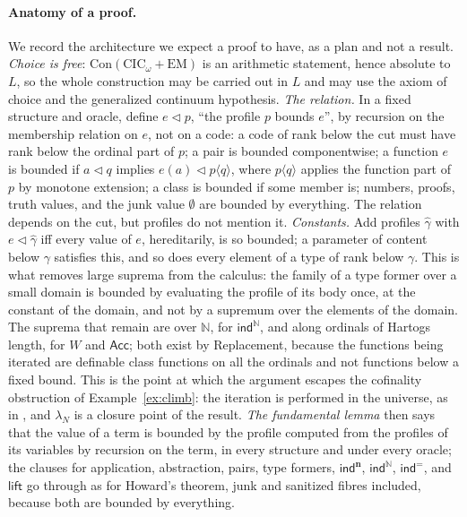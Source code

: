 \documentclass[10pt]{article}
\newcommand{\N}{\mathbb{N}}
\newcommand{\CIC}{\mathrm{CIC}}
\newcommand{\EM}{\mathrm{EM}}
\newcommand{\Con}{\mathrm{Con}}
\newcommand{\ind}{\mathsf{ind}}
\newcommand{\Acc}{\mathsf{Acc}}
\begin{document}
\paragraph{Anatomy of a proof.}
We record the architecture we expect a proof to have, as a plan and not
a result. \emph{Choice is free}: $\Con(\CIC_\omega+\EM)$ is an arithmetic
statement, hence absolute to $L$, so the whole construction may be
carried out in $L$ and may use the axiom of choice and the generalized
continuum hypothesis. \emph{The relation.} In a fixed structure and
oracle, define $e\lhd p$, ``the profile $p$ bounds $e$'', by recursion on
the membership relation on $e$, not on a code: a code of rank below the
cut must have rank below the ordinal part of $p$; a pair is bounded
componentwise; a function $e$ is bounded if $a\lhd q$ implies
$e(a)\lhd p\langle q\rangle$, where $p\langle q\rangle$ applies the function
part of $p$ by monotone extension; a class is bounded if some member
is; numbers, proofs, truth values, and the junk value $\emptyset$ are
bounded by everything. The relation depends on the cut, but profiles do
not mention it. \emph{Constants.} Add profiles $\hat\gamma$ with
$e\lhd\hat\gamma$ iff every value of $e$, hereditarily, is so bounded; a
parameter of content below $\gamma$ satisfies this, and so does every
element of a type of rank below $\gamma$. This is what removes large
suprema from the calculus: the family of a type former over a small
domain is bounded by evaluating the profile of its body once, at the
constant of the domain, and not by a supremum over the elements of the
domain. The suprema that remain are over $\N$, for $\ind^\N$, and along
ordinals of Hartogs length, for $W$ and $\Acc$; both exist by
Replacement, because the functions being iterated are definable class
functions on all the ordinals and not functions below a fixed bound.
This is the point at which the argument escapes the cofinality
obstruction of Example~\ref{ex:climb}: the iteration is performed in the
universe, as in \cite[\S3]{paper2}, and $\lambda_N$ is a closure point of
the result. \emph{The fundamental lemma} then says that the value of a
term is bounded by the profile computed from the profiles of its
variables by recursion on the term, in every structure and under every
oracle; the clauses for application, abstraction, pairs, type formers,
$\ind^{\mathbf n}$, $\ind^\N$, $\ind^=$, and $\mathsf{lift}$ go through as
for Howard's theorem, junk and sanitized fibres included, because both
are bounded by everything.
\end{document}
